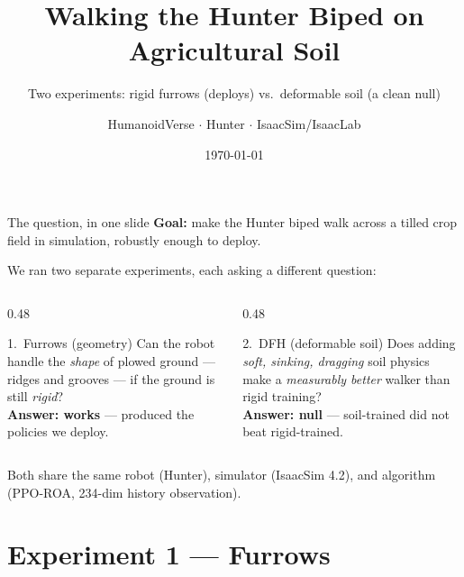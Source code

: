 \documentclass[aspectratio=169,10pt]{beamer}
\title[Furrows \& DFH]{Walking the Hunter Biped on Agricultural Soil}
\subtitle{Two experiments: rigid furrows (deploys) vs.\ deformable soil (a clean null)}
\author{HumanoidVerse $\cdot$ Hunter $\cdot$ IsaacSim/IsaacLab}
\date{\today}
\newcommand{\yes}{\textcolor{good}{\textbf{works}}}
\newcommand{\no}{\textcolor{bad}{\textbf{null}}}
\begin{document}
\begin{frame}[plain]
  \titlepage
\end{frame}

\begin{frame}{The question, in one slide}
  \textbf{Goal:} make the Hunter biped walk across a tilled crop field in simulation,
  robustly enough to deploy.

  \vspace{1em}
  We ran \alert{two separate experiments}, each asking a different question:

  \vspace{0.8em}
  \begin{columns}[T]
    \begin{column}{0.48\textwidth}
      \begin{block}{1.\ Furrows (geometry)}
        Can the robot handle the \emph{shape} of plowed ground --- ridges and
        grooves --- if the ground is still \emph{rigid}?
        \\[0.4em]
        \textbf{Answer: \yes} --- produced the policies we deploy.
      \end{block}
    \end{column}
    \begin{column}{0.48\textwidth}
      \begin{block}{2.\ DFH (deformable soil)}
        Does adding \emph{soft, sinking, dragging} soil physics make a
        \emph{measurably better} walker than rigid training?
        \\[0.4em]
        \textbf{Answer: \no} --- soil-trained did not beat rigid-trained.
      \end{block}
    \end{column}
  \end{columns}

  \vspace{1em}
  \footnotesize Both share the same robot (Hunter), simulator (IsaacSim 4.2),
  and algorithm (PPO-ROA, 234-dim history observation).
\end{frame}

\section{Experiment 1 --- Furrows}
\end{document}
